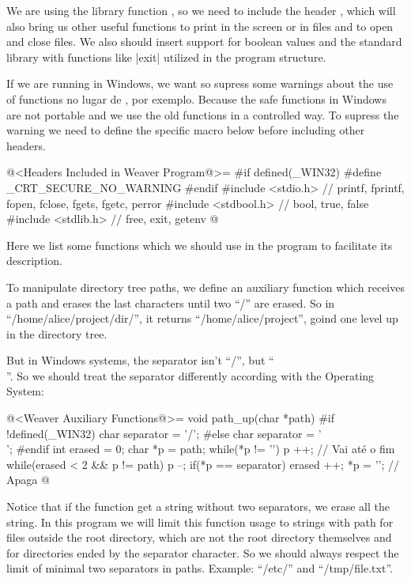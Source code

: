 We are using the library function , so we need to
include the header , which will also bring us
other useful functions to print in the screen or in files and to open
and close files. We also should insert support for boolean values and
the standard library with functions like |exit| utilized in the
program structure.

If we are running in Windows, we want so supress some warnings about
the use of functions  no lugar
de , por exemplo. Because the safe functions in
Windows are not portable and we use the old functions in a controlled
way. To supress the warning we need to define the specific macro below
before including other headers.

\iniciocodigo
@<Headers Included in Weaver Program@>=
#if defined(_WIN32)
#define _CRT_SECURE_NO_WARNING
#endif
#include <stdio.h> // printf, fprintf, fopen, fclose, fgets, fgetc, perror
#include <stdbool.h> // bool, true, false
#include <stdlib.h> // free, exit, getenv
@
\fimcodigo


Here we list some functions which we should use in the program to
facilitate its description.


To manipulate directory tree paths, we define an auxiliary function
which receives a path and erases the last characters until two ``/''
are erased. So in ``/home/alice/project/dir/'', it returns
``/home/alice/project'', goind one level up in the directory tree.

But in Windows systems, the separator isn't ``/'', but ``\\''. So we
should treat the separator differently according with the Operating
System:

\iniciocodigo
@<Weaver Auxiliary Functions@>=
void path_up(char *path){
#if !defined(_WIN32)
  char separator = '/';
#else
  char separator = '\\';
#endif
  int erased = 0;
  char *p = path;
  while(*p != '\0') p ++; // Vai até o fim
  while(erased < 2 && p != path){
    p --;
    if(*p == separator) erased ++;
    *p = '\0'; // Apaga
  }
}
@
\fimcodigo

Notice that if the function get a string without two separators, we
erase all the string. In this program we will limit this function
usage to strings with path for files outside the root directory, which
are not the root directory themselves and for directories ended by the
separator character. So we should always respect the limit of minimal
two separators in paths. Example: ``/etc/'' and ``/tmp/file.txt''.

